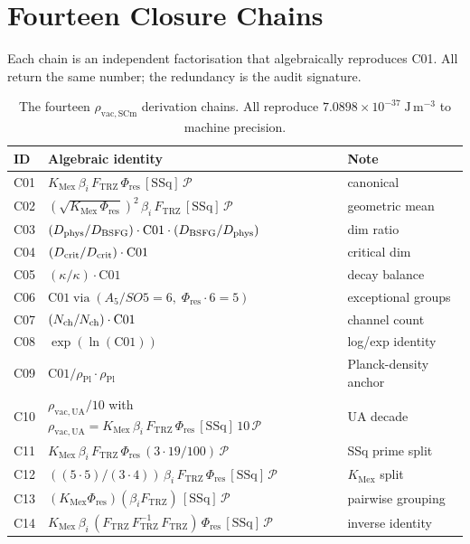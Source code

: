 \documentclass[11pt]{article}
\newcommand{\KMex}{K_{\mathrm{Mex}}}
\newcommand{\Ftrz}{F_{\mathrm{TRZ}}}
\newcommand{\Phires}{\Phi_{\mathrm{res}}}
\newcommand{\SSq}{[\mathrm{SSq}]}
\newcommand{\bi}{\beta_{i}}
\newcommand{\rSCm}{\rho_{\mathrm{vac,SCm}}}
\newcommand{\rUA}{\rho_{\mathrm{vac,UA}}}
\newcommand{\rpl}{\rho_{\mathrm{Pl}}}
\begin{document}
\section{Fourteen Closure Chains}
Each chain is an independent factorisation that algebraically reproduces C01.
All return the same number; the redundancy is the audit signature.

\begin{table}[h!]
\centering
\begin{tabular}{lll}
\toprule
ID & Algebraic identity & Note \\
\midrule
C01 & $\KMex\,\bi\,\Ftrz\,\Phires\,\SSq\,\mathcal{P}$       & canonical \\
C02 & $(\sqrt{\KMex\,\Phires})^{2}\,\bi\,\Ftrz\,\SSq\,\mathcal{P}$ & geometric mean \\
C03 & $(D_{\rm phys}/D_{\rm BSFG})\cdot\text{C01}\cdot(D_{\rm BSFG}/D_{\rm phys})$ & dim ratio \\
C04 & $(D_{\rm crit}/D_{\rm crit})\cdot\text{C01}$               & critical dim \\
C05 & $(\kappa/\kappa)\cdot\text{C01}$                          & decay balance \\
C06 & $\text{C01}\;\text{via}\;(A_5/SO5=6,\;\Phires\cdot 6=5)$    & exceptional groups \\
C07 & $(N_{\rm ch}/N_{\rm ch})\cdot\text{C01}$                  & channel count \\
C08 & $\exp(\ln(\text{C01}))$                                   & log/exp identity \\
C09 & $\text{C01}/\rpl \cdot \rpl$                              & Planck-density anchor \\
C10 & $\rUA/10$ with $\rUA = \KMex\,\bi\,\Ftrz\,\Phires\,\SSq\,10\,\mathcal{P}$ & UA decade \\
C11 & $\KMex\,\bi\,\Ftrz\,\Phires\,(3\cdot 19/100)\,\mathcal{P}$   & SSq prime split \\
C12 & $((5\!\cdot\!5)/(3\!\cdot\!4))\,\bi\,\Ftrz\,\Phires\,\SSq\,\mathcal{P}$ & $\KMex$ split \\
C13 & $(\KMex\Phires)(\bi\Ftrz)\,\SSq\,\mathcal{P}$              & pairwise grouping \\
C14 & $\KMex\,\bi\,(\Ftrz\,\Ftrz^{-1}\,\Ftrz)\,\Phires\,\SSq\,\mathcal{P}$ & inverse identity \\
\bottomrule
\end{tabular}
\caption{The fourteen $\rSCm$ derivation chains. All reproduce
$7.0898\times 10^{-37}\;\mathrm{J\,m^{-3}}$ to machine precision.}
\end{table}
\end{document}
